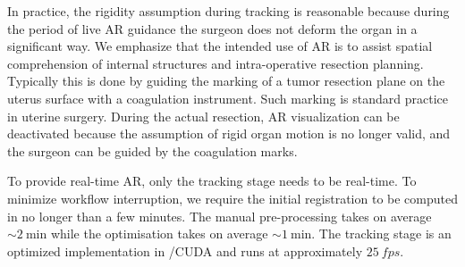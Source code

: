 In practice, the rigidity assumption during tracking is reasonable because during the period of live AR guidance the surgeon does not deform the organ in a significant way.
We emphasize that the intended use of AR is to assist spatial comprehension of internal structures and intra-operative resection planning. Typically this is done by guiding the marking of a tumor resection plane on the uterus surface with a coagulation instrument. Such marking is standard practice in uterine surgery. During the actual resection, AR visualization can be deactivated because the assumption of rigid organ motion is no longer valid, and the surgeon can be guided by the coagulation marks.

To provide real-time AR, only the tracking stage needs to be real-time. To minimize workflow interruption, we require the initial registration to be computed in no longer than a few minutes. 
The manual pre-processing takes on average $\sim\SI{2}{\minute}$ while the optimisation takes on average $\sim\SI{1}{\minute}$.
The tracking stage is an optimized implementation in \CC/CUDA and runs at approximately $\SI{25}{fps}$.